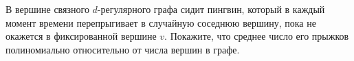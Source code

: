 В вершине связного $d$-регулярного графа сидит пингвин, который в каждый момент времени перепрыгивает в
случайную соседнюю вершину, пока не окажется в фиксированной вершине $v$. Покажите, что среднее число его
прыжков полиномиально относительно от числа вершин в графе.
